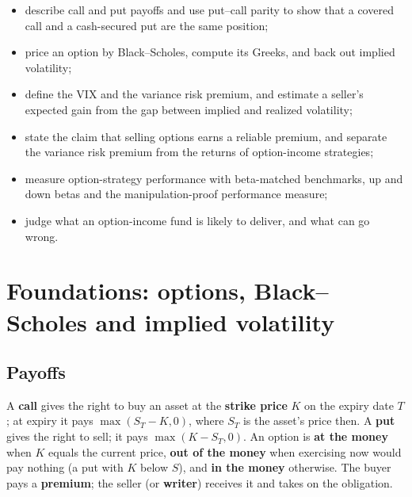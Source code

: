 \begin{itemize}
  \item describe call and put payoffs and use put--call parity to show that a covered call and a cash-secured put are the same position;
  \item price an option by Black--Scholes, compute its Greeks, and back out implied volatility;
  \item define the VIX and the variance risk premium, and estimate a seller's expected gain from the gap between implied and realized volatility;
  \item state the claim that selling options earns a reliable premium, and separate the variance risk premium from the returns of option-income strategies;
  \item measure option-strategy performance with beta-matched benchmarks, up and down betas and the manipulation-proof performance measure;
  \item judge what an option-income fund is likely to deliver, and what can go wrong.
\end{itemize}

\section{Foundations: options, Black--Scholes and implied volatility}
\label{sec:14-foundations}

\subsection{Payoffs}

A \textbf{call} gives the right to buy an asset at the \textbf{strike price} $K$ on the expiry date $T$; at expiry it pays $\max(S_T - K, 0)$, where $S_T$ is the asset's price then. A \textbf{put} gives the right to sell; it pays $\max(K - S_T, 0)$. An option is \textbf{at the money} when $K$ equals the current price, \textbf{out of the money} when exercising now would pay nothing (a put with $K$ below $S$), and \textbf{in the money} otherwise. The buyer pays a \textbf{premium}; the seller (or \textbf{writer}) receives it and takes on the obligation.

